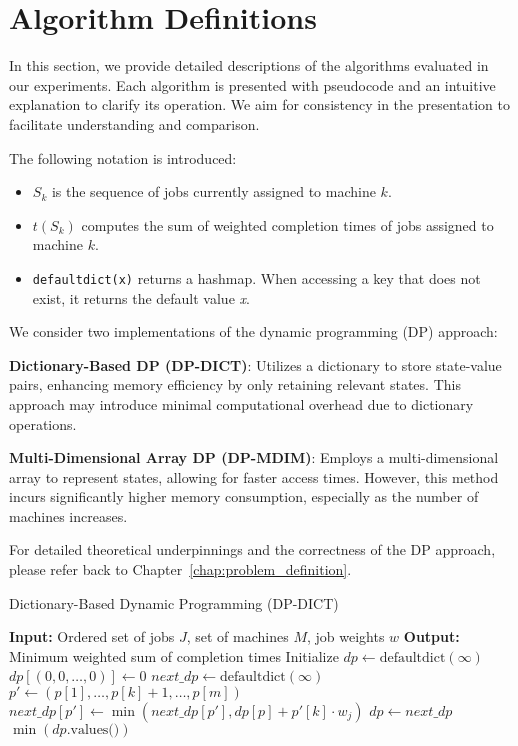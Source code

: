 \section{Algorithm Definitions} \label{sec:algorithm_definitions}

In this section, we provide detailed descriptions of the algorithms evaluated in our experiments. Each algorithm is presented with pseudocode and an intuitive explanation to clarify its operation. We aim for consistency in the presentation to facilitate understanding and comparison.

The following notation is introduced:
\begin{itemize}
    \item $S_k$ is the sequence of jobs currently assigned to machine $k$.
    \item $t(S_k)$ computes the sum of weighted completion times of jobs assigned to machine $k$.
    \item \texttt{defaultdict(x)} returns a hashmap. When accessing a key that does not exist, it returns the default value \textit{x}.
\end{itemize}

We consider two implementations of the dynamic programming (DP) approach:

\textbf{Dictionary-Based DP (DP-DICT)}: Utilizes a dictionary to store state-value pairs, enhancing memory efficiency by only retaining relevant states. This approach may introduce minimal computational overhead due to dictionary operations.

\textbf{Multi-Dimensional Array DP (DP-MDIM)}: Employs a multi-dimensional array to represent states, allowing for faster access times. However, this method incurs significantly higher memory consumption, especially as the number of machines increases.

For detailed theoretical underpinnings and the correctness of the DP approach, please refer back to Chapter~\ref{chap:problem_definition}.

\begin{algorithm}[H]
    \caption{Dictionary-Based Dynamic Programming (DP-DICT)}\label{alg:dpdict}
    \begin{algorithmic}[1]
        \State \textbf{Input:} Ordered set of jobs $J$, set of machines $M$, job weights $w$
        \State \textbf{Output:} Minimum weighted sum of completion times
        \State Initialize $dp \gets \text{defaultdict}(\infty)$
        \State $dp[(0, 0, \dots, 0)] \gets 0$
            \State $next\_dp \gets \text{defaultdict}(\infty)$
                        \State $p' \gets (p[1], \dots, p[k]+1, \dots, p[m])$
                        \State $next\_dp[p'] \gets \min(next\_dp[p'], dp[p] + p'[k] \cdot w_j)$
                    \EndIf
                \EndFor
            \EndFor
            \State $dp \gets next\_dp$
        \EndFor
        \State \Return $\min(dp.\text{values()})$
    \end{algorithmic}
\end{algorithm}

